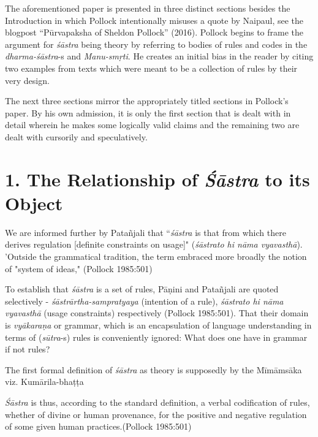 The aforementioned paper is presented in three distinct sections besides the Introduction in which Pollock intentionally misuses a quote by Naipaul, see the blogpost ``Pūrvapaksha of Sheldon Pollock'' (2016). Pollock begins to frame the argument for {\sl śāstra} being theory by referring to bodies of rules and codes in the {\sl dharma-śāstra}-s and {\sl Manu-smṛti}. He creates an initial bias in the reader by citing two examples from texts which were meant to be a collection of rules by their very design.

The next three sections mirror the appropriately titled sections in Pollock's paper. By his own admission, it is only the first section that is dealt with in detail wherein he makes some logically valid claims and the remaining two are dealt with cursorily and speculatively.

\section*{1. The Relationship of {{\sl\bfseries Śāstra}\relax} to its Object}

We are informed further by Patañjali that  ``{\sl śāstra} is that from which there derives regulation [definite constraints on usage]" ({\sl śāstrato hi nāma vyavasthā}). 'Outside the grammatical tradition, the term embraced more broadly the notion of "system of ideas," (Pollock 1985:501)

To establish that {\sl śāstra} is a set of rules, Pāṇini and Patañjali are quoted selectively - {\sl śāstrārtha-sampratyaya} (intention of a rule), {\sl śāstrato hi nāma vyavasthā} (usage constraints) respectively (Pollock 1985:501). That their domain is {\sl vyākaraṇa} or grammar, which is an encapsulation of language understanding in terms of ({\sl sūtra}-s) rules is conveniently ignored: What does one have in grammar if not rules? 

The first formal definition of {\sl śāstra} as theory is supposedly by the Mīmāmsāka viz. Kumārila-bhaṭṭa

\newpage

\begin{myquote}
{{\sl Śāstra}} is thus, according to the standard definition, a verbal codification of rules, whether of divine or human provenance, for the positive and negative regulation of some given human practices.\hfill (Pollock 1985:501)
\end{myquote}

